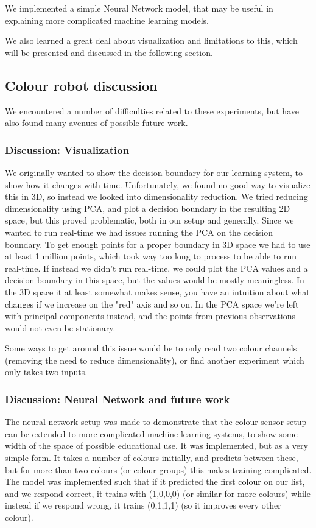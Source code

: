 \documentclass[11pt, a4paper]{article}
\begin{document}
	We implemented a simple Neural Network model, that may be useful in explaining more complicated machine learning models.
	
	We also learned a great deal about visualization and limitations to this, which will be presented and discussed in the following section.
	\subsection{Colour robot discussion}
	We encountered a number of difficulties related to these experiments, but have also found many avenues of possible future work.
	\subsubsection{Discussion: Visualization}
	We originally wanted to show the decision boundary for our learning system, to show how it changes with time. Unfortunately, we found no good way to visualize this in 3D, so instead we looked into dimensionality reduction. We tried reducing dimensionality using PCA, and plot a decision boundary in the resulting 2D space, but this proved problematic, both in our setup and generally. Since we wanted to run real-time we had issues running the PCA on the decision boundary. To get enough points for a proper boundary in 3D space we had to use at least 1 million points, which took way too long to process to be able to run real-time. If instead we didn't run real-time, we could plot the PCA values and a decision boundary in this space, but the values would be mostly meaningless. In the 3D space it at least somewhat makes sense, you have an intuition about what changes if we increase on the "red" axis and so on. In the PCA space we're left with principal components instead, and the points from previous observations would not even be stationary.
	
	Some ways to get around this issue would be to only read two colour channels (removing the need to reduce dimensionality), or find another experiment which only takes two inputs. 
	\subsubsection{Discussion: Neural Network and future work}
	The neural network setup was made to demonstrate that the colour sensor setup can be extended to more complicated machine learning systems, to show some width of the space of possible educational use. It was implemented, but as a very simple form. It takes a number of colours initially, and predicts between these, but for more than two colours (or colour groups) this makes training complicated. The model was implemented such that if it predicted the first colour on our list, and we respond correct, it trains with (1,0,0,0) (or similar for more colours) while instead if we respond wrong, it trains (0,1,1,1) (so it improves every other colour). 
	
\end{document}
